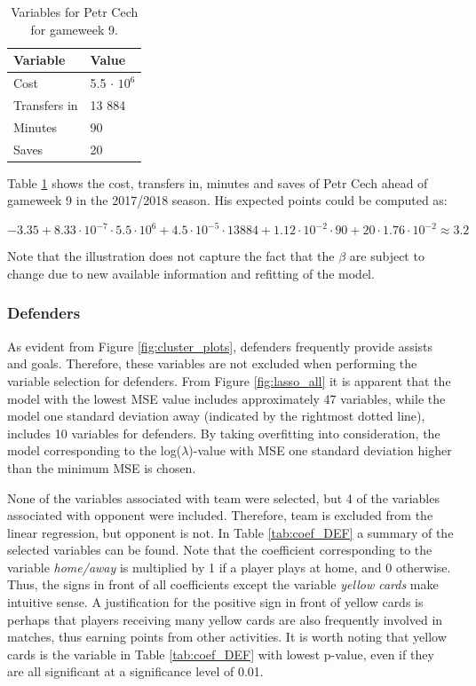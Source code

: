 \begin{table}[H]
\centering
\begin{tabular}{|l|l|}
\hline
Variable     & Value   \\ \hline
Cost         & 5.5 $\cdot$ $10^6$ \\
Transfers in & 13 884   \\
Minutes      & 90      \\
Saves        & 20     \\
\hline
\end{tabular}
\caption{Variables for Petr Cech for gameweek 9.}
\label{tab:var_petr}
\end{table}

Table \ref{tab:var_petr} shows the cost, transfers in, minutes and saves of Petr Cech ahead of gameweek 9 in the 2017/2018 season. His expected points could be computed as:

\begin{equation*}
    -3.35 + 8.33\cdot10^{-7}\cdot5.5\cdot10^6 + 4.5\cdot10^{-5}\cdot13 884 + 1.12\cdot10^{-2}\cdot90 + 20\cdot1.76\cdot10^{-2} \approx 3.2
\end{equation*}

Note that the illustration does not capture the fact that the $\beta$ are subject to change due to new available information and refitting of the model.


\subsubsection{Defenders}

As evident from Figure \ref{fig:cluster_plots}, defenders frequently provide assists and goals. Therefore, these variables are not excluded when performing the variable selection for defenders. From Figure \ref{fig:lasso_all} it is apparent that the model with the lowest MSE value includes approximately 47 variables, while the model one standard deviation away (indicated by the rightmost dotted line), includes 10 variables for defenders. By taking overfitting into consideration, the model corresponding to the log($\lambda$)-value with MSE one standard deviation higher than the minimum MSE is chosen.

\newpar

None of the variables associated with team were selected, but 4 of the variables associated with opponent were included. Therefore, team is excluded from the linear regression, but opponent is not. In Table \ref{tab:coef_DEF} a summary of the selected variables can be found. Note that the coefficient corresponding to the variable \textit{home/away} is multiplied by 1 if a player plays at home, and 0 otherwise. Thus, the signs in front of all coefficients except the variable \textit{yellow cards} make intuitive sense. A justification for the positive sign in front of yellow cards is perhaps that players receiving many yellow cards are also frequently involved in matches, thus earning points from other activities. It is worth noting that yellow cards is the variable in Table \ref{tab:coef_DEF} with lowest p-value, even if they are all significant at a significance level of 0.01.

